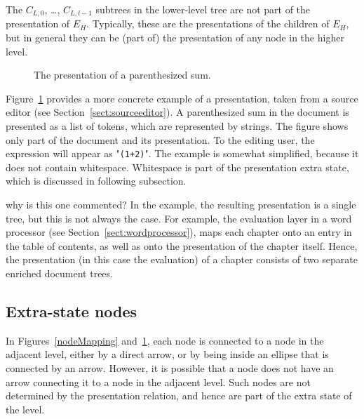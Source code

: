 The $C_{L,0}$, \dots, $C_{L,l-1}$ subtrees in the lower-level tree are not part of the presentation of $E_H$. Typically, these are the presentations of the children of $E_H$, but in general they can be (part of) the presentation of any node in the higher level. 

\begin{figure}
\begin{center}
\begin{center}
%
%
\end{center}
\caption{The presentation of a parenthesized sum.}\label{presentExample} 
\end{center}
\end{figure}

Figure~\ref{presentExample} provides a more concrete example of a presentation, taken from a source editor (see Section~\ref{sect:sourceeditor}). A parenthesized sum in the document is presented as a list of tokens, which are represented by strings.  The figure shows only part of the document and its presentation. To the editing user, the expression will appear as "{\tt (1+2)}". The example is somewhat simplified, because it does not contain whitespace. Whitespace is part of the presentation extra state, which is discussed in following subsection.

\bc  why is this one commented?
In the example, the resulting presentation is a single tree, but this is not always the case. For example, the evaluation layer in a word processor (see Section~\ref{sect:wordprocessor}), maps each chapter onto an entry in the table of contents, as well as onto the presentation of the chapter itself. Hence, the presentation (in this case the evaluation) of a chapter consists of two separate enriched document trees.
\ec






%																
\subsection{Extra-state nodes}

In Figures~\ref{nodeMapping} and~\ref{presentExample}, each node is connected to a node in the adjacent level, either by a direct arrow, or by being inside an ellipse that is connected by an arrow. However, it is possible that a node does not have an arrow connecting it to a node in the adjacent level. Such nodes are not determined by the presentation relation, and hence are part of the extra state of the level.

